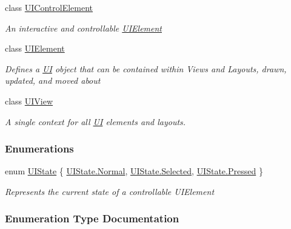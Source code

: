 \begin{DoxyCompactItemize}
class \hyperlink{class_m_b2_d_1_1_u_i_1_1_u_i_control_element}{U\+I\+Control\+Element}
\begin{DoxyCompactList}\small\item\em An interactive and controllable \hyperlink{class_m_b2_d_1_1_u_i_1_1_u_i_element}{U\+I\+Element} \end{DoxyCompactList}\item 
class \hyperlink{class_m_b2_d_1_1_u_i_1_1_u_i_element}{U\+I\+Element}
\begin{DoxyCompactList}\small\item\em Defines a \hyperlink{namespace_m_b2_d_1_1_u_i}{UI} object that can be contained within Views and Layouts, drawn, updated, and moved about \end{DoxyCompactList}\item 
class \hyperlink{class_m_b2_d_1_1_u_i_1_1_u_i_view}{U\+I\+View}
\begin{DoxyCompactList}\small\item\em A single context for all \hyperlink{namespace_m_b2_d_1_1_u_i}{UI} elements and layouts. \end{DoxyCompactList}\end{DoxyCompactItemize}
\subsubsection*{Enumerations}
\begin{DoxyCompactItemize}
\item 
enum \hyperlink{namespace_m_b2_d_1_1_u_i_a3d5fed7e80959a1444165894dfd9e75b}{U\+I\+State} \{ \hyperlink{namespace_m_b2_d_1_1_u_i_a3d5fed7e80959a1444165894dfd9e75ba960b44c579bc2f6818d2daaf9e4c16f0}{U\+I\+State.\+Normal}, 
\hyperlink{namespace_m_b2_d_1_1_u_i_a3d5fed7e80959a1444165894dfd9e75ba91b442d385b54e1418d81adc34871053}{U\+I\+State.\+Selected}, 
\hyperlink{namespace_m_b2_d_1_1_u_i_a3d5fed7e80959a1444165894dfd9e75bad78a68f6a85421ae121c2cb5b73a1040}{U\+I\+State.\+Pressed}
 \}\begin{DoxyCompactList}\small\item\em Represents the current state of a controllable U\+I\+Element \end{DoxyCompactList}
\end{DoxyCompactItemize}


\subsubsection{Enumeration Type Documentation}
\hypertarget{namespace_m_b2_d_1_1_u_i_a3d5fed7e80959a1444165894dfd9e75b}{}\label{namespace_m_b2_d_1_1_u_i_a3d5fed7e80959a1444165894dfd9e75b} 
